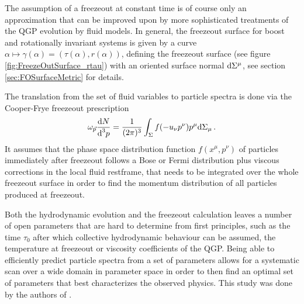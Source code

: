 The assumption of a freezeout at constant time is of course only an approximation that can be improved upon by more sophisticated treatments of the QGP evolution by fluid models. In general, the freezeout surface for boost and rotationally invariant systems is given by a curve ${\alpha\mapsto\gamma(\alpha)=(\tau(\alpha),r(\alpha))}$, defining the freezeout surface (see figure \ref{fig:FreezeOutSurface_rtau}) with an oriented surface normal $\text{d}\Sigma^\mu$, see section \ref{sec:FOSurfaceMetric} for details. 

The translation from the set of fluid variables to particle spectra is done via the Cooper-Frye freezeout prescription \cite{CooperFrye_1974}
\begin{equation}
    \omega_{\vec{p}}\frac{\text{d} N}{\text{d}^3 p}=\frac{1}{(2\pi)^3}\int_\Sigma f(-u_\nu p^\nu)p^\mu\text{d}\Sigma_\mu\,.
\end{equation}
It assumes that the phase space distribution function $f(x^\mu,p^\nu)$ of particles immediately after freezeout follows a Bose or Fermi distribution plus viscous corrections in the local fluid restframe, that needs to be integrated over the whole freezeout surface in order to find the momentum distribution of all particles produced at freezeout.

Both the hydrodynamic evolution and the freezeout calculation leaves a number of open parameters that are hard to determine from first principles, such as the time $\tau_0$ after which collective hydrodynamic behaviour can be assumed, the temperature at freezeout or viscosity coefficients of the QGP. Being able to efficiently predict particle spectra from a set of parameters allows for a systematic scan over a wide domain in parameter space in order to then find an optimal set of parameters that best characterizes the observed physics. This study was done by the authors of \cite{KirchnerEtAl_2023}.